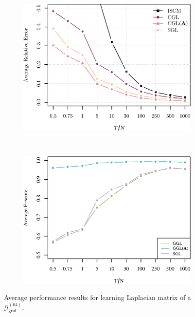 \begin{figure}[!htb]
    \centering
    \begin{subfigure}[b]{0.47\textwidth}
        \includegraphics[width=\textwidth]{grid/relative_error_grid.eps}
    \end{subfigure}
    ~ %
    \begin{subfigure}[b]{0.47\textwidth}
        \includegraphics[width=\textwidth]{grid/fscore_grid.eps}
    \end{subfigure}
    \caption{Average performance results for learning Laplacian matrix of a $\mathcal{G}^{(64)}_{\mathsf{grid}}$.}
    \label{fig:performance-grid}
\end{figure}
